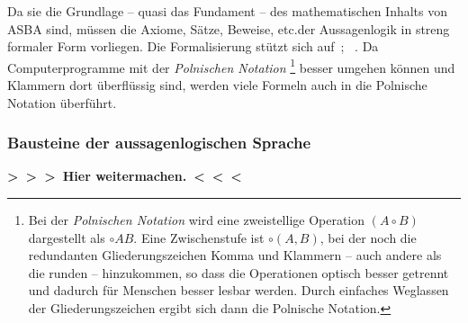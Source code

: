 \documentclass[english,ngerman,parskip=half,headsepline,footsepline,
	fleqn,notitlepage]{scrreprt}
\makeatletter
\newcommand*{\glsidx}[1]{\gls{#1}\idx{gls{#1}}}
\newcommand*{\todo}[1]{\textbf{>~>~>~#1~<~<~<}}%
\newcommand*{\textetc}{etc.\@ }
\makeatother
\begin{document}
	Da sie die Grundlage
	-- quasi das Fundament --
	des mathematischen Inhalts von \glsidx{ASBA} sind,
	müssen die Axiome, Sätze, Beweise, \textetc der Aussagenlogik
	in streng formaler Form vorliegen.
	Die Formalisierung stützt sich auf~\cite{bib:Aussagenlogik};
	\alsoname~\cite{bib:LogikDe, bib:LogikEn}.
	Da Computerprogramme mit der
	\emph{Polnischen Notation}%
	\footnote{%
		Bei der \emph{Polnischen Notation} wird eine zweistellige
		Operation $(A\circ B)$ dargestellt als $\circ A B$.
		Eine Zwischenstufe ist $\circ(A,B)$,
		bei der noch die redundanten Gliederungszeichen Komma und Klammern
		-- auch andere als die runden --
		hinzukommen, so dass die Operationen optisch besser getrennt
		und dadurch für Menschen besser lesbar werden.
		Durch einfaches Weglassen der Gliederungszeichen
		ergibt sich dann die Polnische Notation.%
	}
	besser umgehen können und Klammern dort überflüssig sind,
	werden viele Formeln auch in die Polnische Notation überführt.

	\subsubsection{Bausteine der aussagenlogischen Sprache}%
	\label{subsub:Bausteine}

\todo{Hier weitermachen.}%

	\newcommand*{\ItemB}[2]{\item[]\makebox[0.7cm][l]
		{#1}\makebox[4.0cm][l]{#2}}
	\newcommand*{\ItemF}[2]{\item[]\makebox[2.0cm][l]%
		{#1}\makebox[4.5cm][l]{#2}}

	\newcommand*{\ase}{_\mathrm{e}}%
	\newcommand*{\asp}{^\mathrm{P}}%
	\newcommand*{\aspe}{\asp\ase}%
	\newcommand*{\asb}{^\mathrm{B}}%

	\newcommand*{\asN}{\mathbb{N}_0}%
	\newcommand*{\asA}{\mathcal{A}}%
	\newcommand*{\asB}{\mathcal{B}}%
	\newcommand*{\asC}{\mathcal{C}}%
	\newcommand*{\asF}{\mathcal{F}}%
	\newcommand*{\asJ}{\mathcal{J}}%
	\newcommand*{\asS}{\mathcal{S}}%
	\newcommand*{\asU}{\mathcal{U}}%
	\newcommand*{\asV}{\mathcal{V}}%
	\newcommand*{\asX}{\mathcal{X}}%
	\newcommand*{\asAe}{\asA\ase}%
	\newcommand*{\asBe}{\asB\ase}%
	\newcommand*{\asXe}{\asX\ase}%
	\newcommand*{\asFe}{\asF\ase}%
	\newcommand*{\asFp}{\asF\asp}%
	\newcommand*{\asFep}{\asF\aspe}%
\end{document}
